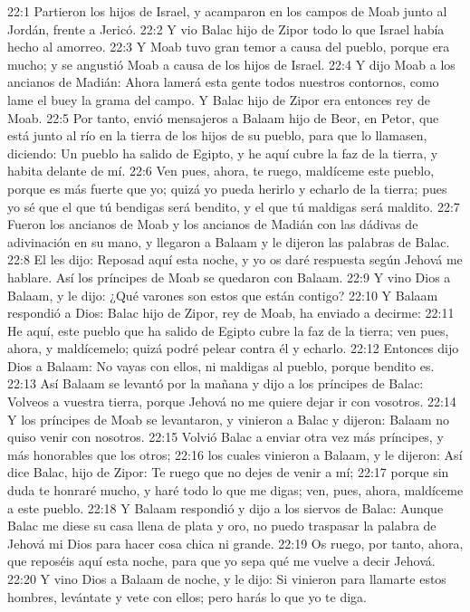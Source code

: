 22:1 Partieron los hijos de Israel, y acamparon en los campos de Moab junto al Jordán, frente a Jericó. 
22:2 Y vio Balac hijo de Zipor todo lo que Israel había hecho al amorreo.  
22:3 Y Moab tuvo gran temor a causa del pueblo, porque era mucho; y se angustió Moab a causa de los hijos de Israel.  
22:4 Y dijo Moab a los ancianos de Madián: Ahora lamerá esta gente todos nuestros contornos, como lame el buey la grama del campo. Y Balac hijo de Zipor era entonces rey de Moab. 
22:5 Por tanto, envió mensajeros a Balaam hijo de Beor, en Petor, que está junto al río en la tierra de los hijos de su pueblo, para que lo llamasen, diciendo: Un pueblo ha salido de Egipto, y he aquí cubre la faz de la tierra, y habita delante de mí.  
22:6 Ven pues, ahora, te ruego, maldíceme este pueblo, porque es más fuerte que yo; quizá yo pueda herirlo y echarlo de la tierra; pues yo sé que el que tú bendigas será bendito, y el que tú maldigas será maldito.  
22:7 Fueron los ancianos de Moab y los ancianos de Madián con las dádivas de adivinación en su mano, y llegaron a Balaam y le dijeron las palabras de Balac.  
22:8 El les dijo: Reposad aquí esta noche, y yo os daré respuesta según Jehová me hablare. Así los príncipes de Moab se quedaron con Balaam.  
22:9 Y vino Dios a Balaam, y le dijo: ¿Qué varones son estos que están contigo?  
22:10 Y Balaam respondió a Dios: Balac hijo de Zipor, rey de Moab, ha enviado a decirme:  
22:11 He aquí, este pueblo que ha salido de Egipto cubre la faz de la tierra; ven pues, ahora, y maldícemelo; quizá podré pelear contra él y echarlo.  
22:12 Entonces dijo Dios a Balaam: No vayas con ellos, ni maldigas al pueblo, porque bendito es.  
22:13 Así Balaam se levantó por la mañana y dijo a los príncipes de Balac: Volveos a vuestra tierra, porque Jehová no me quiere dejar ir con vosotros.  
22:14 Y los príncipes de Moab se levantaron, y vinieron a Balac y dijeron: Balaam no quiso venir con nosotros.  
22:15 Volvió Balac a enviar otra vez más príncipes, y más honorables que los otros;  
22:16 los cuales vinieron a Balaam, y le dijeron: Así dice Balac, hijo de Zipor: Te ruego que no dejes de venir a mí;  
22:17 porque sin duda te honraré mucho, y haré todo lo que me digas; ven, pues, ahora, maldíceme a este pueblo. 
22:18 Y Balaam respondió y dijo a los siervos de Balac: Aunque Balac me diese su casa llena de plata y oro, no puedo traspasar la palabra de Jehová mi Dios para hacer cosa chica ni grande.  
22:19 Os ruego, por tanto, ahora, que reposéis aquí esta noche, para que yo sepa qué me vuelve a decir Jehová.  
22:20 Y vino Dios a Balaam de noche, y le dijo: Si vinieron para llamarte estos hombres, levántate y vete con ellos; pero harás lo que yo te diga.  
